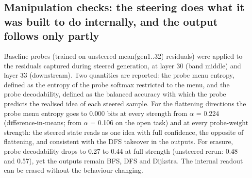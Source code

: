 \documentclass[11pt,letterpaper]{article}
\begin{document}
\subsection{Manipulation checks: the steering does what it was built to do internally, and the output follows only partly}
Baseline probes (trained on unsteered mean(gen1..32) residuals) were applied to the residuals captured during steered generation, at layer 30 (band middle) and layer 33 (downstream). Two quantities are reported: the probe menu entropy, defined as the entropy of the probe softmax restricted to the menu, and the probe decodability, defined as the balanced accuracy with which the probe predicts the realised idea of each steered sample. For the flattening directions the probe menu entropy goes to 0.000 bits at every strength from \ensuremath{\alpha} = 0.224 (difference-in-means; from \ensuremath{\alpha} = 0.106 on the open task) and at every probe-weight strength: the steered state reads as one idea with full confidence, the opposite of flattening, and consistent with the DFS takeover in the outputs. For erasure, probe decodability drops to 0.27 to 0.44 at full strength (unsteered rerun: 0.48 and 0.57), yet the outputs remain BFS, DFS and Dijkstra. The internal readout can be erased without the behaviour changing.
\end{document}
